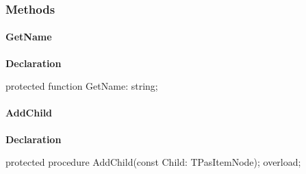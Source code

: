 \documentclass{report}
\newif\ifpdf
\begin{document}
\subsubsection*{\large{\textbf{Methods}}\normalsize\hspace{1ex}\hfill}
\paragraph*{GetName}\hspace*{\fill}

\label{PasDoc_HierarchyTree.TPasItemNode-GetName}
\begin{list}{}{
\setlength{\itemindent}{0cm}
\setlength{\listparindent}{0cm}
\setlength{\leftmargin}{\evensidemargin}
\addtolength{\leftmargin}{\tmplength}
\settowidth{\labelsep}{X}
\addtolength{\leftmargin}{\labelsep}
\setlength{\labelwidth}{\tmplength}
}
\item[\textbf{Declaration}\hfill]
\ifpdf
\begin{flushleft}
\fi
\begin{ttfamily}
protected function GetName: string;\end{ttfamily}

\ifpdf
\end{flushleft}
\fi

\end{list}
\paragraph*{AddChild}\hspace*{\fill}

\label{PasDoc_HierarchyTree.TPasItemNode-AddChild}
\begin{list}{}{
\setlength{\itemindent}{0cm}
\setlength{\listparindent}{0cm}
\setlength{\leftmargin}{\evensidemargin}
\addtolength{\leftmargin}{\tmplength}
\settowidth{\labelsep}{X}
\addtolength{\leftmargin}{\labelsep}
\setlength{\labelwidth}{\tmplength}
}
\item[\textbf{Declaration}\hfill]
\ifpdf
\begin{flushleft}
\fi
\begin{ttfamily}
protected procedure AddChild(const Child: TPasItemNode); overload;\end{ttfamily}

\ifpdf
\end{flushleft}
\fi

\end{list}
\end{document}
